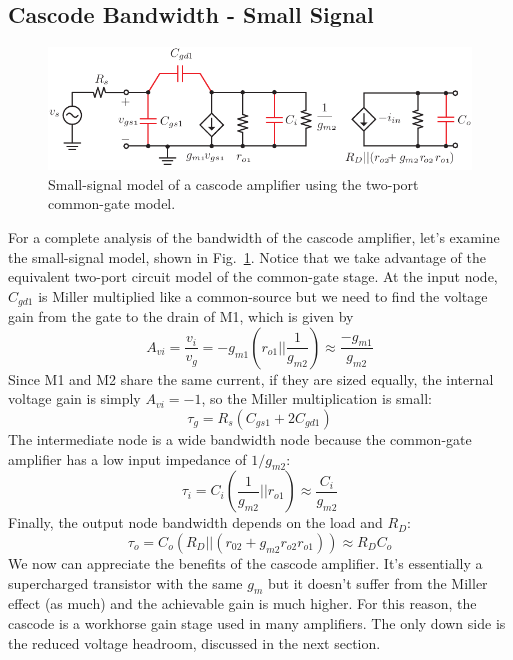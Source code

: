 \subsection{Cascode Bandwidth - Small Signal}
\begin{figure}[tb]
\centering
\includegraphics[scale=1]{14cascode_ac_ss}
\caption{Small-signal model of a cascode amplifier using the two-port common-gate model.} \label{fig:14cascode_ac_ss}
\end{figure}
For a complete analysis of the bandwidth of the cascode amplifier, let's examine the small-signal model, shown in Fig.~\ref{fig:14cascode_ac_ss}.  Notice that we take advantage of the equivalent two-port circuit model of the common-gate stage.   At the input node, $C_{gd1}$ is Miller multiplied like a common-source but we need to find the voltage gain from the gate to the drain of M1, which is given by
    \begin{equation}
        A_{vi} = \frac{v_i}{v_g} = -g_{m1} \left( r_{o1} || \frac{1}{g_{m2}} \right) \approx \frac{-g_{m1}}{g_{m2}}
    \end{equation}
Since M1 and M2 share the same current, if they are sized equally, the internal voltage gain is simply $A_{vi} = -1$, so the Miller multiplication is small:
    \begin{equation}
        \tau_g = R_{s} (C_{gs1} + 2 C_{gd1})
    \end{equation}
The intermediate node is a wide bandwidth node because the common-gate amplifier has a low input impedance of $1/g_{m2}$:
    \begin{equation}
        \tau_i = C_i \left(\frac{1}{g_{m2}} || r_{o1}  \right) \approx \frac{C_i}{g_{m2}}
    \end{equation}  
Finally, the output node bandwidth depends on the load and $R_D$:
    \begin{equation}
        \tau_o = C_o (R_D || (r_{02} + g_{m2}r_{o2} r_{o1})) \approx R_D C_o
    \end{equation}
We now can appreciate the benefits of the cascode amplifier.  It's essentially a supercharged transistor with the same $g_m$ but it doesn't suffer from the Miller effect (as much) and the achievable gain is much higher.  For this reason, the cascode is a workhorse gain stage used in many amplifiers.  The only down side is the reduced voltage headroom, discussed in the next section.
